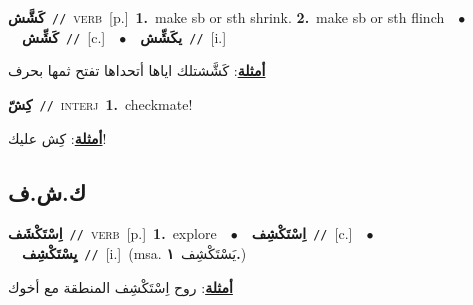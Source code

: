 \documentclass[10pt,a4paper,twoside]{article} %
\begin{document}
\begin{multicols}{2}
{\setlength\topsep{0pt}\textbf{\foreignlanguage{arabic}{كَشَّش}}\ {\color{gray}\texttt{//}\color{black}}\ \textsc{verb}\ [p.]\ \textbf{1.}~make sb or sth shrink.  \textbf{2.}~make sb or sth flinch\ \ $\bullet$\ \ \setlength\topsep{0pt}\textbf{\foreignlanguage{arabic}{كَشِّش}}\ {\color{gray}\texttt{//}\color{black}}\ [c.]\ \ $\bullet$\ \ \setlength\topsep{0pt}\textbf{\foreignlanguage{arabic}{يكَشِّش}}\ {\color{gray}\texttt{//}\color{black}}\ [i.]\  \begin{flushright}\color{gray}\foreignlanguage{arabic}{\textbf{\underline{\foreignlanguage{arabic}{أمثلة}}}: كَشَّشتلك اياها أتحداها تفتح ثمها بحرف}\end{flushright}\color{black}} \vspace{2mm}

{\setlength\topsep{0pt}\textbf{\foreignlanguage{arabic}{كِشّ}}\ {\color{gray}\texttt{//}\color{black}}\ \textsc{interj}\ \textbf{1.}~checkmate!\  \begin{flushright}\color{gray}\foreignlanguage{arabic}{\textbf{\underline{\foreignlanguage{arabic}{أمثلة}}}: كِش عليك!}\end{flushright}\color{black}} \vspace{2mm}

\vspace{-3mm}
\subsection*{\color{blue}\foreignlanguage{arabic}{ك.ش.ف}\color{blue}{}} 

{\setlength\topsep{0pt}\textbf{\foreignlanguage{arabic}{اِسْتَكْشَف}}\ {\color{gray}\texttt{//}\color{black}}\ \textsc{verb}\ [p.]\ \textbf{1.}~explore\ \ $\bullet$\ \ \setlength\topsep{0pt}\textbf{\foreignlanguage{arabic}{اِسْتَكْشِف}}\ {\color{gray}\texttt{//}\color{black}}\ [c.]\ \ $\bullet$\ \ \setlength\topsep{0pt}\textbf{\foreignlanguage{arabic}{يِسْتَكْشِف}}\ {\color{gray}\texttt{//}\color{black}}\ [i.]\ \color{gray}(msa. \foreignlanguage{arabic}{يَسْتَكْشِف}~\foreignlanguage{arabic}{\textbf{١.}})\color{black}\  \begin{flushright}\color{gray}\foreignlanguage{arabic}{\textbf{\underline{\foreignlanguage{arabic}{أمثلة}}}: روح اِسْتَكْشِف المنطقة مع أخوك}\end{flushright}\color{black}} \vspace{2mm}


\end{multicols}
\end{document}
